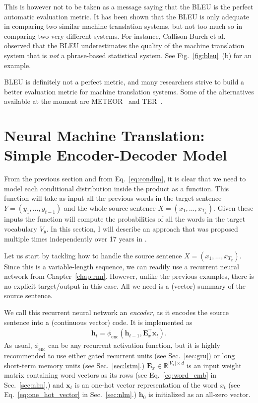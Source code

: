 \documentclass{report}
\newcommand{\vect}[1]{\mathbf{#1}}
\newcommand{\matr}[1]{\mathbf{#1}}
\newcommand{\vh}[0]{\vect{h}}
\newcommand{\vx}[0]{\vect{x}}
\newcommand{\mE}[0]{\matr{E}}
\newcommand{\RR}[0]{\mathbb{R}}
\newcommand{\enc}{\text{enc}}
\begin{document}
This is however not to be taken as a message saying that the BLEU is the perfect
automatic evaluation metric. It has been shown that the BLEU is only adequate in
comparing two similar machine translation systems, but not too much so in
comparing two very different systems. For instance, Callison-Burch et
al.~\cite{callison2006re} observed that the BLEU underestimates the quality of
the machine translation system that is {\em not} a phrase-based statistical
system. See Fig.~\ref{fig:bleu}~(b) for an example.

BLEU is definitely not a perfect metric, and many researchers strive to build a
better evaluation metric for machine translation systems. Some of the
alternatives available at the moment are
METEOR~\cite{denkowski:lavie:meteor-wmt:2014} and TER~\cite{snover2006study}.

\section{Neural Machine Translation: \\ Simple Encoder-Decoder Model}
\label{sec:nmt_simple}

From the previous section and  from Eq.~\ref{eq:condlm}, it is clear that we
need to model each conditional distribution inside the product as a function.
This function will take as input all the previous words in the target sentence
$Y=(y_1, \ldots, y_{t-1})$ and the whole source sentence $X=(x_1, \ldots, x_{T_x})$.
Given these inputs the function will compute the probabilities of all the words
in the target vocabulary $V_y$. In this section, I will describe an approach
that was proposed multiple times independently over 17 years in
\cite{forcada1997recursive,cho2014learning,sutskever2014sequence}.

Let us start by tackling how to handle the source sentence $X=(x_1, \ldots,
x_{T_x})$. Since this is a variable-length sequence, we can readily use a
recurrent neural network from Chapter~\ref{chap:rnn}. However, unlike the
previous examples, there is no explicit target/output in this case. All we need
is a (vector) summary of the source sentence.

We call this recurrent neural network an {\em encoder}, as it encodes the source
sentence into a (continuous vector) code. It is implemented as
\begin{align}
    \label{eq:nmt_encoder}
    \vh_t = \phi_{\enc}\left( \vh_{t-1}, \mE_x^\top \vx_t \right).
\end{align}
As usual, $\phi_{\enc}$ can be any recurrent activation function, but it is
highly recommended to use either gated recurrent units (see Sec.~\ref{sec:gru})
or long short-term memory units (see Sec.~\ref{sec:lstm}.) $\mE_x \in \RR^{|V_x|
\times d}$ is an input weight matrix containing word vectors as its rows (see
Eq.~\eqref{eq:word_emb} in Sec.~\ref{sec:nlm},) and $\vx_t$ is an one-hot vector
representation of the word $x_t$ (see Eq.~\eqref{eq:one_hot_vector} in
Sec.~\ref{sec:nlm}.) $\vh_0$ is initialized as an all-zero vector.
\end{document}
